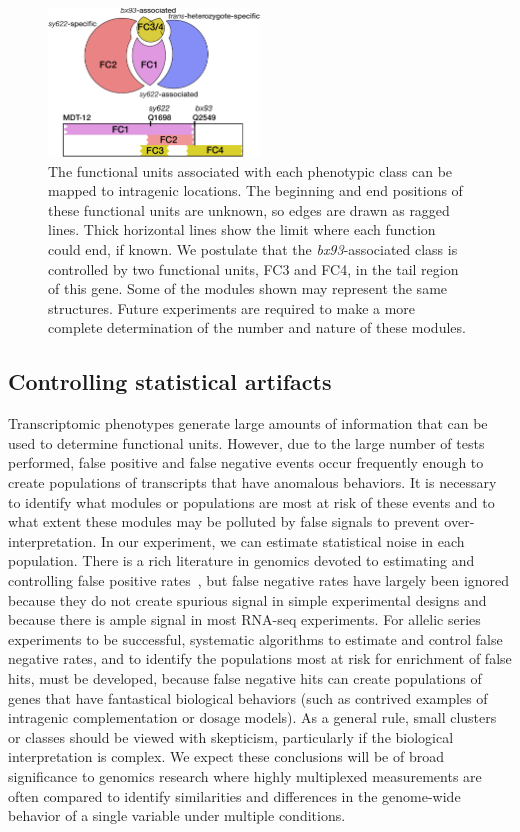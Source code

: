 \documentclass[10pt, twocolumn]{article}
\begin{document}
\begin{figure}
  \centering{}
  \includegraphics[width=0.5\textwidth]{../figs/inferred_domains.pdf}
  \caption{
    The functional units associated with each phenotypic class can be
    mapped to intragenic locations. The beginning and end positions of
    these functional units are unknown,
    so edges are drawn as ragged lines. Thick horizontal lines show the
    limit where each function could end, if known. We postulate that the
    \emph{bx93}-associated class is controlled by two functional units, FC3 and
    FC4, in the tail region of this gene. Some of the modules shown may
    represent the same structures. Future experiments are required to make a more
    complete determination of the number and nature of these modules.
  }
\label{fig:domains}
\end{figure}

\subsection*{Controlling statistical artifacts}
Transcriptomic phenotypes generate large amounts of information that can be used
to determine functional units. However, due to the large number of tests
performed, false positive and false negative events occur frequently enough to
create populations of transcripts that have anomalous behaviors. It is necessary
to identify what modules or populations are most at risk of these events and to
what extent these modules may be polluted by false signals to prevent
over-interpretation. In our experiment, we can estimate statistical noise in
each population. There is a rich literature in genomics devoted to estimating and
controlling false positive rates~\cite{Storey2003,Benjamini1995}, but false
negative rates have largely been ignored because they do not create spurious
signal in simple experimental designs and because there is ample signal in most
RNA-seq experiments. For allelic series experiments to be successful, systematic
algorithms to estimate and control false negative rates, and to identify the
populations most at risk for enrichment of false hits, must be developed,
because false negative hits can create populations of genes that have
fantastical biological behaviors (such as contrived examples of intragenic
complementation or dosage models). As a general rule, small clusters or classes
should be viewed with skepticism, particularly if the biological interpretation
is complex. We expect these conclusions will be of broad significance to genomics
research where highly multiplexed measurements are often compared to identify
similarities and differences in the genome-wide behavior of a single variable
under multiple conditions.
\end{document}
